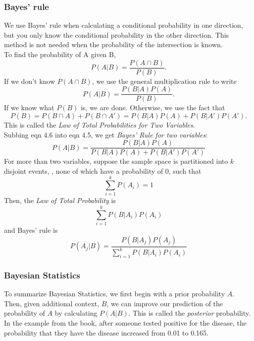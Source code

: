 \subsubsection{Bayes' rule}  %
We use Bayes' rule when calculating a conditional probability in one direction, but you only know the conditional probability in the other direction. This method is not needed when the probability of the intersection is known. \\
To find the probability of A given B,
\begin{equation}
    P(A\vert B)=\frac{P(A\cap B)}{P(B)}.
\end{equation}
If we don't know $P(A\cap B)$, we use the general multiplication rule to write
\begin{equation}
    P(A\vert B)=\frac{P(B\vert A)P(A)}{P(B)}.
\end{equation}
If we know what $P(B)$ is, we are done. Otherwise, we use the fact that
\begin{equation}
    P(B)=P(B\cap A)+P(B\cap A')=P(B\vert A)P(A) + P(B\vert A')P(A').
\end{equation}
This is called the \emph{Law of Total Probabilities for Two Variables}. \\
Subbing eqn 4.6 into eqn 4.5, we get \emph{Bayes' Rule for two variables}:
\begin{equation}
    P(A\vert B)=\frac{P(B\vert A)P(A)}{P(B\vert A)P(A)+P(B\vert A')P(A')}
\end{equation}
For more than two variables, suppose the sample space is partitioned into $k$ disjoint events, , none of which have a probability of 0, such that
\begin{equation}
    \sum^k_{i=1}P(A_i)=1
\end{equation}
Then, the \emph{Law of Total Probability} is
\begin{equation}
    \sum^k_{i=1}P(B\vert A_i)P(A_i)
\end{equation}
and Bayes' rule is
\begin{equation}
    P(A_j\vert B)=\frac{P(B\vert A_j)P(A_j)}{\sum^k_{i=1}P(B\vert A_i)P(A_i)}
\end{equation}
\subsubsection{Bayesian Statistics}  %
To summarize Bayesian Statistics, we first begin with a prior probability $A$. Then, given additional context, $B$, we can improve our prediction of the probability of $A$ by calculating $P(A\vert B)$. This is called the \emph{posterior} probability. In the example from the book, after someone tested positive for the disease, the probability that they have the disease increased from 0.01 to 0.165.
